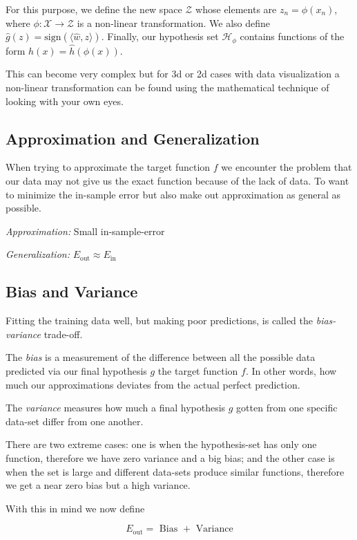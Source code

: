 For this purpose, we define the new space \(\mathcal{Z}\) whose elements are \(z_n = \phi(x_n)\), where 
\(\phi: \mathcal{X} \to \mathcal{Z}\) is a non-linear transformation. We also define \(\hat{g}(z) = \text{sign}(\langle \hat{w}, z \rangle)\).
Finally, our hypothesis set \(\mathcal{H}_{\phi}\) contains functions of the form \(h(x) = \hat{h}(\phi(x))\).

This can become very complex but for 3d or 2d cases with data visualization a non-linear transformation can be found 
using the mathematical technique of looking with your own eyes. 

\subsection{Approximation and Generalization}

When trying to approximate the target function \(f\) we encounter the problem that our data may not 
give us the exact function because of the lack of data. To want to minimize the in-sample error 
but also make out approximation as general as possible.

\emph{Approximation:} Small in-sample-error

\emph{Generalization:} \(E_{\text{out}} \approx E_{\text{in}}\)

\subsection{Bias and Variance}

Fitting the training data well, but making poor predictions, is called the \emph{bias-variance} trade-off.

The \emph{bias} is a measurement of the difference between all the possible data predicted via our final 
hypothesis \(g\) the target function \(f\). In other words, how much our approximations deviates from the actual perfect 
prediction.

The \emph{variance} measures how much a final hypothesis \(g\) gotten from one specific 
data-set differ from one another.

There are two extreme cases: one is when the hypothesis-set has only one function, therefore we have zero 
variance and a big bias; and the other case is when the set is large and different data-sets produce similar functions, 
therefore we get a near zero bias but a high variance.

With this in mind we now define 

\[
    E_{\text{out}} = \text{ Bias } + \text{ Variance} 
\]

